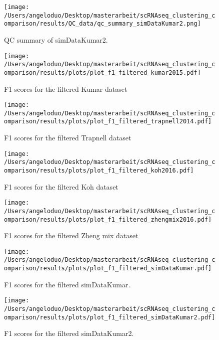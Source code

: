 \documentclass[11pt, a4paper]{article}\usepackage[]{graphicx}\usepackage[]{color}
\begin{document}
\begin{figure}[!h]
\texttt{[image: /Users/angeloduo/Desktop/masterarbeit/scRNAseq\_clustering\_comparison/results/QC\_data/qc\_summary\_simDataKumar2.png]}
\caption{QC summary of simDataKumar2. }
\label{fig:simDataKumar}
\end{figure}
\clearpage




\begin{figure}[!h]
\texttt{[image: /Users/angeloduo/Desktop/masterarbeit/scRNAseq\_clustering\_comparison/results/plots/plot\_f1\_filtered\_kumar2015.pdf]}
\caption{F1 scores for the filtered Kumar dataset }
\label{fig:f1kumar}
\end{figure}

\begin{figure}[!h]
\texttt{[image: /Users/angeloduo/Desktop/masterarbeit/scRNAseq\_clustering\_comparison/results/plots/plot\_f1\_filtered\_trapnell2014.pdf]}
\caption{F1 scores for  the filtered Trapnell dataset }
\label{fig:f1trapnell}
\end{figure}

\begin{figure}[!h]
\texttt{[image: /Users/angeloduo/Desktop/masterarbeit/scRNAseq\_clustering\_comparison/results/plots/plot\_f1\_filtered\_koh2016.pdf]}
\caption{F1 scores for the filtered Koh dataset }
\label{fig:f1koh}
\end{figure}

\begin{figure}[!h]
\texttt{[image: /Users/angeloduo/Desktop/masterarbeit/scRNAseq\_clustering\_comparison/results/plots/plot\_f1\_filtered\_zhengmix2016.pdf]}
\caption{F1 scores for the filtered Zheng mix dataset }
\label{fig:f1zheng}
\end{figure}

\begin{figure}[!h]
\texttt{[image: /Users/angeloduo/Desktop/masterarbeit/scRNAseq\_clustering\_comparison/results/plots/plot\_f1\_filtered\_simDataKumar.pdf]}
\caption{F1 scores for the filtered simDataKumar. }
\label{fig:f1sim}
\end{figure}

\begin{figure}[!h]
\texttt{[image: /Users/angeloduo/Desktop/masterarbeit/scRNAseq\_clustering\_comparison/results/plots/plot\_f1\_filtered\_simDataKumar2.pdf]}
\caption{F1 scores for the filtered simDataKumar2. }
\label{fig:f1sim2}
\end{figure}
\end{document}
